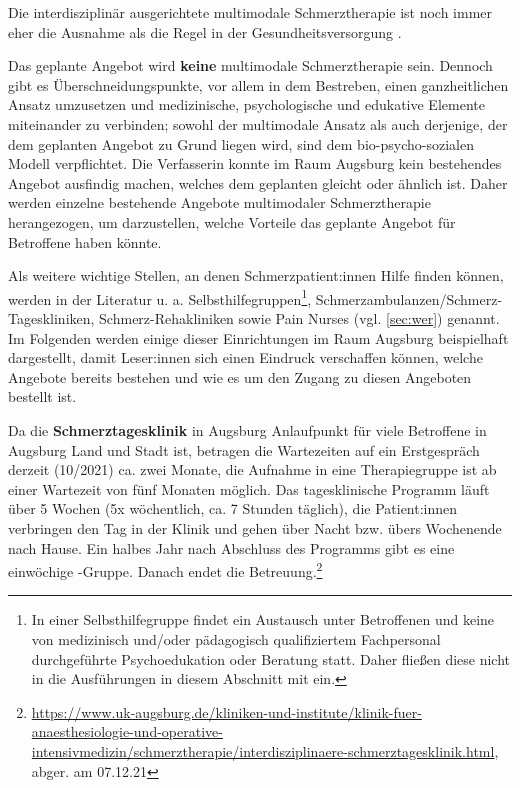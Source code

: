 \documentclass[
  twoside,
  parskip=half-,
  paper=176mm:246mm,
  BCOR=14mm,
  DIV=14,
]{scrreprt}
\begin{document}
Die interdisziplinär ausgerichtete multimodale Schmerztherapie ist noch immer eher die Ausnahme als die Regel in der Gesundheitsversorgung \autocite[99]{nobisHerausforderung}. 
\begin{praxis}
  Das geplante Angebot wird \textbf{keine} multimodale Schmerztherapie sein. Dennoch gibt es Überschneidungspunkte, vor allem in dem Bestreben, einen ganzheitlichen Ansatz umzusetzen und medizinische, psychologische und edukative Elemente miteinander zu verbinden; sowohl der multimodale Ansatz als auch derjenige, der dem geplanten Angebot zu Grund liegen wird, sind dem bio-psycho-sozialen Modell verpflichtet. Die Verfasserin konnte im Raum Augsburg kein bestehendes Angebot ausfindig machen, welches dem geplanten gleicht oder ähnlich ist. Daher werden einzelne bestehende Angebote multimodaler Schmerztherapie herangezogen, um darzustellen, welche Vorteile das geplante Angebot für Betroffene haben könnte.
\end{praxis}

Als weitere wichtige Stellen, an denen Schmerzpatient:innen Hilfe finden können, werden in der Literatur \autocite[vgl.][Kap. 7]{nobisHerausforderung} u. a. Selbsthilfegruppen\footnote{In einer Selbsthilfegruppe findet ein Austausch unter Betroffenen und keine von medizinisch und/oder pädagogisch qualifiziertem Fachpersonal durchgeführte Psychoedukation oder Beratung statt. Daher fließen diese nicht in die Ausführungen in diesem Abschnitt mit ein.}, Schmerzambulanzen/Schmerz-Tageskliniken, Schmerz-Rehakliniken sowie Pain Nurses (vgl. \autoref{sec:wer}) genannt. Im Folgenden werden einige dieser Einrichtungen im Raum Augsburg beispielhaft dargestellt, damit Leser:innen sich einen Eindruck verschaffen können, welche Angebote bereits bestehen und wie es um den Zugang zu diesen Angeboten bestellt ist.

Da die \textbf{Schmerztagesklinik} in Augsburg Anlaufpunkt für viele Betroffene in Augsburg Land und Stadt ist, betragen die Wartezeiten auf ein Erstgespräch derzeit (10/2021) ca. zwei Monate, die Aufnahme in eine Therapiegruppe ist ab einer Wartezeit von fünf Monaten möglich. Das tagesklinische Programm läuft über 5 Wochen (5x wöchentlich, ca. 7 Stunden täglich), die Patient:innen verbringen den Tag in der Klinik und gehen über Nacht bzw. übers Wochenende nach Hause. Ein halbes Jahr nach Abschluss des Programms gibt es eine einwöchige -Gruppe. Danach endet die Betreuung.\footnote{\url{https://www.uk-augsburg.de/kliniken-und-institute/klinik-fuer-anaesthesiologie-und-operative-intensivmedizin/schmerztherapie/interdisziplinaere-schmerztagesklinik.html}, abger. am 07.12.21}
\end{document}
